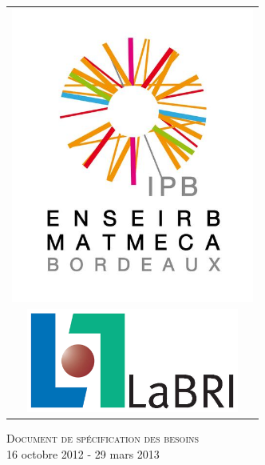 \documentclass[12pt]{article}
\title{}
\author{\ST\\\QL\\\LL\\\DB\\\AH\\\BR\\\LH}
\begin{document}
\begin{center}
    \begin{tabular}{c}
      
      \includegraphics [width=80mm]{ENSEIRB-MATMECA.jpg} \\
         
      \includegraphics [width=70mm]{logo-LaBRI-couleur.jpg}\\
      
      
    \end{tabular}
    
      
    \textsc{\Large Document de spécification des besoins}\\[0.5cm]
           {\large 16 octobre 2012 - 29 mars 2013}\\
           
           
           \HRule \\[0.4cm]
                  \HRule \\[1.5cm]
                  
                  \begin{center}
                    

\end{center}
\end{center}
\end{document}
